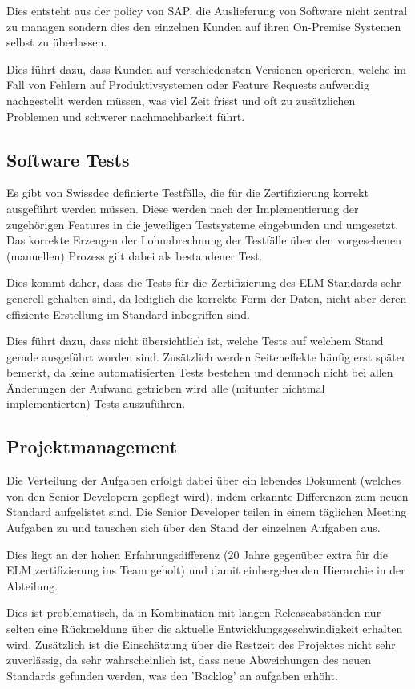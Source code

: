 Dies entsteht aus der policy von SAP, die Auslieferung von Software nicht zentral zu managen sondern dies den einzelnen Kunden auf ihren On-Premise Systemen selbst zu überlassen.

Dies führt dazu, dass Kunden auf verschiedensten Versionen operieren, welche im Fall von Fehlern auf Produktivsystemen oder Feature Requests aufwendig nachgestellt werden müssen, was viel Zeit frisst und oft zu zusätzlichen Problemen und schwerer nachmachbarkeit führt. 

\subsection{Software Tests}

Es gibt von Swissdec definierte Testfälle, die für die Zertifizierung korrekt ausgeführt werden müssen. Diese werden nach der Implementierung der zugehörigen Features in die jeweiligen Testsysteme eingebunden und umgesetzt. Das korrekte Erzeugen der Lohnabrechnung der Testfälle über den vorgesehenen (manuellen) Prozess gilt dabei als bestandener Test.

Dies kommt daher, dass die Tests für die Zertifizierung des ELM Standards sehr generell gehalten sind, da lediglich die korrekte Form der Daten, nicht aber deren effiziente Erstellung im Standard inbegriffen sind.

Dies führt dazu, dass nicht übersichtlich ist, welche Tests auf welchem Stand gerade ausgeführt worden sind. Zusätzlich werden Seiteneffekte häufig erst später bemerkt, da keine automatisierten Tests bestehen und demnach nicht bei allen Änderungen der Aufwand getrieben wird alle (mitunter nichtmal implementierten) Tests auszuführen. 

\subsection{Projektmanagement}

Die Verteilung der Aufgaben erfolgt dabei über ein lebendes Dokument (welches von den Senior Developern gepflegt wird), indem erkannte Differenzen zum neuen Standard aufgelistet sind. Die Senior Developer teilen in einem täglichen Meeting Aufgaben zu und tauschen sich über den Stand der einzelnen Aufgaben aus.

Dies liegt an der hohen Erfahrungsdifferenz (20 Jahre gegenüber extra für die ELM zertifizierung ins Team geholt) und damit einhergehenden Hierarchie in der Abteilung.

Dies ist problematisch, da in Kombination mit langen Releaseabständen nur selten eine Rückmeldung über die aktuelle Entwicklungsgeschwindigkeit erhalten wird. Zusätzlich ist die Einschätzung über die Restzeit des Projektes nicht sehr zuverlässig, da sehr wahrscheinlich ist, dass neue Abweichungen des neuen Standards gefunden werden, was den 'Backlog' an aufgaben erhöht.

